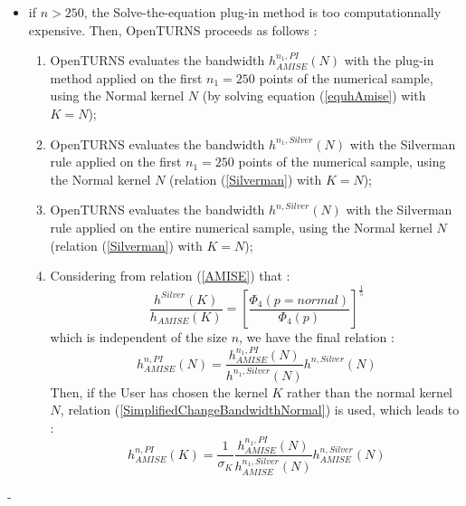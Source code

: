 {\begin{itemize}
  \item if $n>250$, the Solve-the-equation  plug-in method is too computationnally expensive. Then, OpenTURNS proceeds as follows :
    \begin{enumerate}
    \item OpenTURNS evaluates the bandwidth $h^{n_1, PI}_{AMISE}(N)$ with the plug-in method applied on the first $n_1 = 250$ points of the numerical sample, using the Normal kernel $N$ (by solving equation (\ref{equhAmise}) with $K=N$);
    \item OpenTURNS evaluates the bandwidth $h^{n_1, Silver}(N)$ with the Silverman rule applied on the first $n_1 = 250$ points of the numerical sample, using the Normal kernel $N$ (relation (\ref{Silverman}) with $K=N$);
    \item OpenTURNS evaluates the bandwidth $h^{n, Silver}(N)$ with the Silverman rule applied on the entire numerical sample, using the Normal kernel $N$ (relation (\ref{Silverman}) with $K=N$);
    \item Considering from relation (\ref{AMISE})  that :
      \begin{equation}
        \label{fracSilvAmise}
        \displaystyle \frac{h^{Silver}(K)}{h_{AMISE}(K)} = \left[ \frac{\Phi_4(p=normal)}{\Phi_4(p)}\right]^{\frac{1}{5}}
      \end{equation}
      which is independent of the size $n$, we have the final relation :
      \begin{equation}
        \label{fracSilvAmiseFin}
        \displaystyle h^{n, PI}_{AMISE}(N) = \frac{h^{n_1, PI}_{AMISE}(N)}{h^{n_1, Silver}(N)}h^{n, Silver}(N)
      \end{equation}
      Then, if the User has chosen the kernel $K$ rather than the normal  kernel $N$, relation (\ref{SimplifiedChangeBandwidthNormal}) is used, which leads to :
      \begin{equation}
        \label{OTrule}
        \displaystyle h^{n, PI}_{AMISE}(K) = \frac{1}{\sigma_K} \frac{h^{n_1, PI}_{AMISE}(N)}{h^{n_1, Silver}_{AMISE}(N)}h^{n, Silver}_{AMISE}(N)
      \end{equation}
    \end{enumerate}
  \end{itemize}





    }
    {
      -
    }

